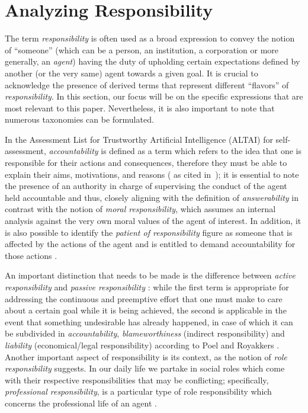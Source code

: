\section{Analyzing Responsibility}\label{sec:responsibility}

The term \textit{responsibility} is often used as a broad expression to convey the notion of ``someone'' (which can be a person, an institution, a corporation or more generally, an \textit{agent}) having the duty of upholding certain expectations defined by another (or the very same) agent towards a given goal.
It is crucial to acknowledge the presence of derived terms that represent different ``flavors'' of \textit{responsibility}.
In this section, our focus will be on the specific expressions that are most relevant to this paper.
Nevertheless, it is also important to note that numerous taxonomies can be formulated.

In the Assessment List for Trustworthy Artificial Intelligence (ALTAI) for self-assessment, \textit{accountability} is defined as a term which refers to the idea that one is responsible for their actions and consequences, therefore they must be able to explain their aims, motivations, and reasons (\cite{ALTAI} as cited in~\cite{NOVAIA}); it is essential to note the presence of an authority in charge of supervising the conduct of the agent held accountable and thus, closely aligning with the definition of \textit{answerability} \parencite{NISAIA} in contrast with the notion of \textit{moral responsibility}, which assumes an internal analysis against the very own moral values of the agent of interest.
In addition, it is also possible to identify the \textit{patient of responsibility} figure as someone that is affected by the actions of the agent and is entitled to demand accountability for those actions \parencite{COEAIR}.

An important distinction that needs to be made is the difference between \textit{active responsibility} and \textit{passive responsibility} \parencite{ETE}: while the first term is appropriate for addressing the continuous and preemptive effort that one must make to care about a certain goal while it is being achieved, the second is applicable in the event that something undesirable has already happened, in case of which it can be subdivided in \textit{accountability}, \textit{blameworthiness} (indirect responsibility) and \textit{liability} (economical/legal responsibility) according to Poel and Royakkers \parencite{ETE}.
Another important aspect of responsibility is its context, as the notion of \textit{role responsibility} suggests.
In our daily life we partake in social roles which come with their respective responsibilities that may be conflicting; specifically, \textit{professional responsibility}, is a particular type of role responsibility which concerns the professional life of an agent \parencite{ETE}.

